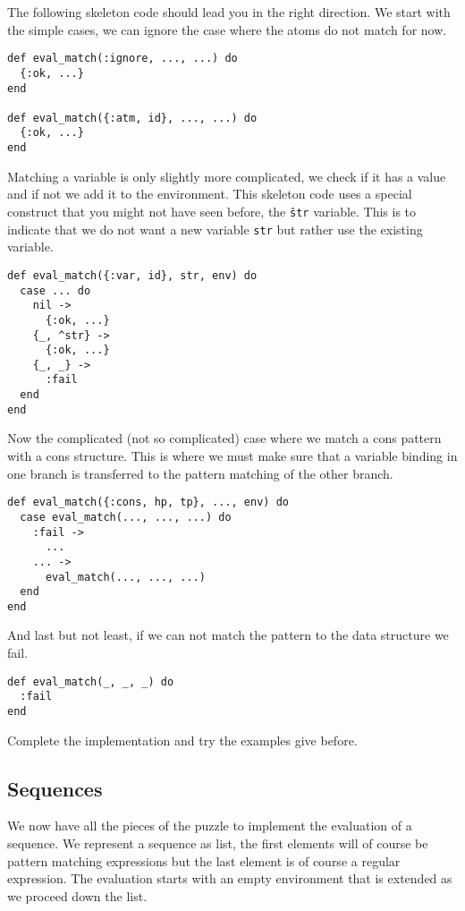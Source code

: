 \documentclass[a4paper,11pt]{article}
\begin{document}
The following skeleton code should lead you in the right direction. We
start with the simple cases, we can ignore the case where the atoms
do not match for now.

\begin{verbatim}
def eval_match(:ignore, ..., ...) do
  {:ok, ...}
end

def eval_match({:atm, id}, ..., ...) do
  {:ok, ...}
end
\end{verbatim}

Matching a variable is only slightly more complicated, we check if it
has a value and if not we add it to the environment. This skeleton
code uses a special construct that you might not have seen before, the
{\tt \^str} variable. This is to indicate that we do not want a new
variable {\tt str} but rather use the existing variable.

\pagebreak

\begin{verbatim}
def eval_match({:var, id}, str, env) do
  case ... do
    nil ->
      {:ok, ...}
    {_, ^str} ->
      {:ok, ...}
    {_, _} ->
      :fail
  end
end
\end{verbatim}

Now the complicated (not so complicated) case where we match a cons
pattern with a cons structure. This is where we must make sure that a
variable binding in one branch is transferred to the pattern matching
of the other branch.

\begin{verbatim}
def eval_match({:cons, hp, tp}, ..., env) do
  case eval_match(..., ..., ...) do
    :fail ->
      ...
    ... ->
      eval_match(..., ..., ...)
  end
end
\end{verbatim}

And last but not least, if we can not match the pattern to the data
structure we fail.

\begin{verbatim}
def eval_match(_, _, _) do
  :fail
end
\end{verbatim}

Complete the implementation and try the examples give before.

\subsection{Sequences}
We now have all the pieces of the puzzle to implement the evaluation
of a sequence. We represent a sequence as list, the first elements
will of course be pattern matching expressions but the last element is
of course a regular expression. The evaluation starts with an empty
environment that is extended as we proceed down the list.
\end{document}
